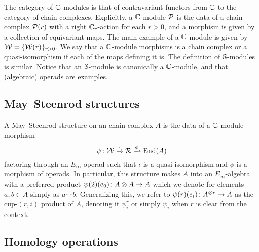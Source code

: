 The category of $\mathbb{C}$-modules is that of contravariant functors from $\mathbb{C}$ to the category of chain complexes.
Explicitly, a $\mathbb{C}$-module $\mathcal{P}$ is the data of a chain complex $\mathcal{P}(r)$ with a right $\mathbb{C}_r$-action for each $r > 0$, and a morphism is given by a collection of equivariant maps.
The main example of a $\mathbb{C}$-module is given by $\mathcal{W} = \{\mathcal{W}(r)\}_{r>0}$.
We say that a $\mathbb{C}$-module morphisms is a chain complex or a quasi-isomorphism if each of the maps defining it is.
The definition of $\mathbb{S}$-modules is similar.
Notice that an $\mathbb{S}$-module is canonically a $\mathbb{C}$-module, and that (algebraic) operads are examples.

\subsection{May--Steenrod structures}

A May--Steenrod structure on an chain complex $A$ is the data of a $\mathbb{C}$-module morphism
\[
\psi \colon \mathcal{W} \xrightarrow{\iota} \mathcal{R} \xrightarrow{\phi} \mathrm{End}(A)
\]
factoring through an $E_\infty$-operad such that $\iota$ is a quasi-isomorphism and $\phi$ is a morphism of operads.
In particular, this structure makes $A$ into an $E_\infty$-algebra with a preferred product $\psi(2)(e_0) \colon A \otimes A \to A$ which we denote for elements $a,b \in A$ simply as $a \smallsmile b$.
Generalizing this, we refer to $\psi(r)(e_i) \colon A^{\otimes r} \to A$ as the cup-$(r,i)$ product of $A$, denoting it $\psi_i^r$ or simply $\psi_i$ when $r$ is clear from the context.

\subsection{Homology operations}

